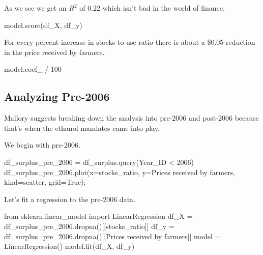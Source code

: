 \documentclass[
  letterpaper,
  DIV=11,
  numbers=noendperiod]{scrreprt}
\newenvironment{Shaded}{\begin{snugshade}}{\end{snugshade}}
\newcommand{\DecValTok}[1]{\textcolor[rgb]{0.68,0.00,0.00}{#1}}
\newcommand{\ImportTok}[1]{\textcolor[rgb]{0.00,0.46,0.62}{#1}}
\newcommand{\NormalTok}[1]{\textcolor[rgb]{0.00,0.23,0.31}{#1}}
\newcommand{\OperatorTok}[1]{\textcolor[rgb]{0.37,0.37,0.37}{#1}}
\newcommand{\StringTok}[1]{\textcolor[rgb]{0.13,0.47,0.30}{#1}}
\newcommand{\VariableTok}[1]{\textcolor[rgb]{0.07,0.07,0.07}{#1}}
\begin{document}
As we see we get an \(R^2\) of 0.22 which isn't bad in the world of
finance.

\begin{Shaded}
\begin{Highlighting}[]
\NormalTok{model.score(df\_X, df\_y)}
\end{Highlighting}
\end{Shaded}

For every percent increase in stocks-to-use ratio there is about a
\$0.05 reduction in the price received by farmers.

\begin{Shaded}
\begin{Highlighting}[]
\NormalTok{model.coef\_ }\OperatorTok{/} \DecValTok{100}
\end{Highlighting}
\end{Shaded}

\hypertarget{analyzing-pre-2006}{%
\subsection{Analyzing Pre-2006}\label{analyzing-pre-2006}}

Mallory suggests breaking down the analysis into pre-2006 and post-2006
because that's when the ethanol mandates came into play.

We begin with pre-2006.

\begin{Shaded}
\begin{Highlighting}[]
\NormalTok{df\_surplus\_pre\_2006 }\OperatorTok{=}\NormalTok{ df\_surplus.query(}\StringTok{\textquotesingle{}Year\_ID \textless{} 2006\textquotesingle{}}\NormalTok{)}
\NormalTok{df\_surplus\_pre\_2006.plot(x}\OperatorTok{=}\StringTok{\textquotesingle{}stocks\_ratio\textquotesingle{}}\NormalTok{, y}\OperatorTok{=}\StringTok{\textquotesingle{}Prices received by farmers\textquotesingle{}}\NormalTok{, kind}\OperatorTok{=}\StringTok{\textquotesingle{}scatter\textquotesingle{}}\NormalTok{, grid}\OperatorTok{=}\VariableTok{True}\NormalTok{)}\OperatorTok{;}
\end{Highlighting}
\end{Shaded}

Let's fit a regression to the pre-2006 data.

\begin{Shaded}
\begin{Highlighting}[]
\ImportTok{from}\NormalTok{ sklearn.linear\_model }\ImportTok{import}\NormalTok{ LinearRegression}
\NormalTok{df\_X }\OperatorTok{=}\NormalTok{ df\_surplus\_pre\_2006.dropna()[[}\StringTok{\textquotesingle{}stocks\_ratio\textquotesingle{}}\NormalTok{]]}
\NormalTok{df\_y }\OperatorTok{=}\NormalTok{ df\_surplus\_pre\_2006.dropna()[[}\StringTok{\textquotesingle{}Prices received by farmers\textquotesingle{}}\NormalTok{]]}
\NormalTok{model }\OperatorTok{=}\NormalTok{ LinearRegression()}
\NormalTok{model.fit(df\_X, df\_y)}
\end{Highlighting}
\end{Shaded}
\end{document}
